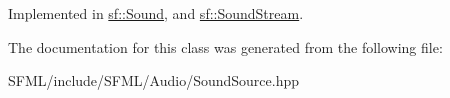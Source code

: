 Implemented in \mbox{\hyperlink{classsf_1_1_sound_aa9c91c34f7c6d344d5ee9b997511f754}{sf\+::\+Sound}}, and \mbox{\hyperlink{classsf_1_1_sound_stream_a16cc6a0404b32e42c4dce184bb94d0f4}{sf\+::\+Sound\+Stream}}.



The documentation for this class was generated from the following file\+:\begin{DoxyCompactItemize}
\item 
S\+F\+M\+L/include/\+S\+F\+M\+L/\+Audio/Sound\+Source.\+hpp\end{DoxyCompactItemize}
